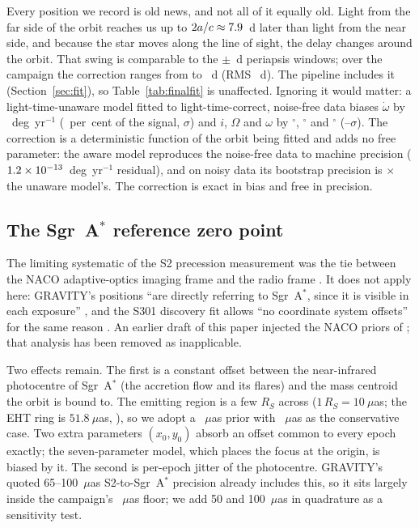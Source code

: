 \documentclass{aastex701}
\begin{document}
Every position we record is old news, and not all of it equally old. Light from the far side of the orbit reaches us up to $2a/c \approx 7.9{}$~d later than light from the near side, and because the star moves along the line of sight, the delay changes around the orbit. That swing is comparable to the $\pm$\campaignDenseHalfWidthDays{}~d periapsis windows; over the campaign the correction ranges from \roemerLtMinDays{} to \roemerLtMaxDays{}~d (RMS \roemerLtRmsDays{}~d). The pipeline includes it (Section~\ref{sec:fit}), so Table~\ref{tab:finalfit} is unaffected. Ignoring it would matter: a light-time-unaware model fitted to light-time-correct, noise-free data biases $\dot\omega$ by \roemerNaiveOmegaDotBias{}~deg~yr$^{-1}$ (\roemerNaiveOmegaDotBiasPct{}~per~cent of the signal, \roemerNaiveOmegaDotBiasNsigma{}$\sigma$) and $i$, $\Omega$ and $\omega$ by \roemerNaiveIBias{}$^\circ$, \roemerNaiveCapOmegaBias{}$^\circ$ and \roemerNaiveOmegaBias{}$^\circ$ (\roemerNaiveAngleNsigmaMin{}--\roemerNaiveAngleNsigmaMax{}$\sigma$). The correction is a deterministic function of the orbit being fitted and adds no free parameter: the aware model reproduces the noise-free data to machine precision ($1.2\times10^{-13}$~deg~yr$^{-1}$ residual), and on noisy data its bootstrap precision is \roemerSigmaRatio{}$\times$ the unaware model's. The correction is exact in bias and free in precision.

\subsection{The Sgr~A$^*$ reference zero point}
\label{sec:refframe}

The limiting systematic of the S2 precession measurement was the tie between the NACO adaptive-optics imaging frame and the radio frame \citep{gravity2020}. It does not apply here: GRAVITY's positions ``are directly referring to Sgr~A$^*$, since it is visible in each exposure'' \citep{gravity2022massdist}, and the S301 discovery fit allows ``no coordinate system offsets'' for the same reason \citep{gravity2026}. An earlier draft of this paper injected the NACO priors of \citet{plewa2015}; that analysis has been removed as inapplicable.

Two effects remain. The first is a constant offset between the near-infrared photocentre of Sgr~A$^*$ (the accretion flow and its flares) and the mass centroid the orbit is bound to. The emitting region is a few $R_S$ across ($1\,R_S = 10~\mu$as; the EHT ring is $51.8~\mu$as, \citealt{eht2022}), so we adopt a ~$\mu$as prior with ~$\mu$as as the conservative case. Two extra parameters $(x_0,y_0)$ absorb an offset common to every epoch exactly; the seven-parameter model, which places the focus at the origin, is biased by it. The second is per-epoch jitter of the photocentre. GRAVITY's quoted 65--100~$\mu$as S2-to-Sgr~A$^*$ precision \citep{gravity2020} already includes this, so it sits largely inside the campaign's \campaignAstrometryUas{}~$\mu$as floor; we add 50 and 100~$\mu$as in quadrature as a sensitivity test.
\end{document}
